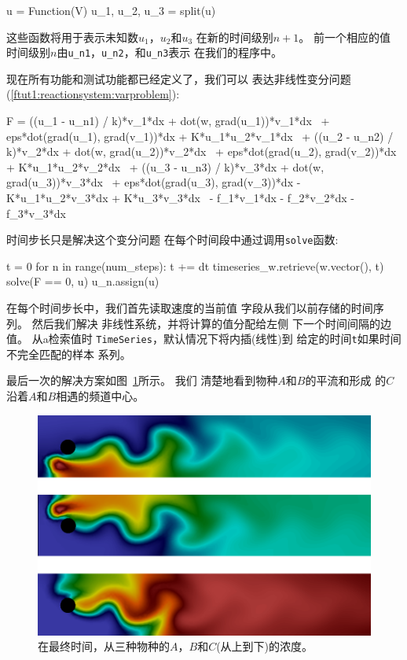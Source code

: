 \begin{python}
u = Function(V)
u_1, u_2, u_3 = split(u)
\end{python}
这些函数将用于表示未知数$u_1$，$u_2$和$u_3$
在新的时间级别$n+1$。 前一个相应的值
时间级别$n$由\verb!u_n1!，\verb!u_n2!，和\verb!u_n3!表示 在我们的程序中。

现在所有功能和测试功能都已经定义了，我们可以
表达非线性变分问题
(\ref{ftut1:reactionsystem:varproblem}):

\begin{python}
F = ((u_1 - u_n1) / k)*v_1*dx + dot(w, grad(u_1))*v_1*dx \
  + eps*dot(grad(u_1), grad(v_1))*dx + K*u_1*u_2*v_1*dx  \
  + ((u_2 - u_n2) / k)*v_2*dx + dot(w, grad(u_2))*v_2*dx \
  + eps*dot(grad(u_2), grad(v_2))*dx + K*u_1*u_2*v_2*dx  \
  + ((u_3 - u_n3) / k)*v_3*dx + dot(w, grad(u_3))*v_3*dx \
  + eps*dot(grad(u_3), grad(v_3))*dx - K*u_1*u_2*v_3*dx + K*u_3*v_3*dx \
  - f_1*v_1*dx - f_2*v_2*dx - f_3*v_3*dx
\end{python}

时间步长只是解决这个变分问题
在每个时间段中通过调用\texttt{solve}函数:

\begin{python}
t = 0
for n in range(num_steps):
    t += dt
    timeseries_w.retrieve(w.vector(), t)
    solve(F == 0, u)
    u_n.assign(u)
\end{python}
在每个时间步长中，我们首先读取速度的当前值
字段从我们以前存储的时间序列。 然后我们解决
非线性系统，并将计算的值分配给左侧
下一个时间间隔的边值。 从a检索值时
\texttt{TimeSeries}，默认情况下将内插(线性)到
给定的时间\texttt{t}如果时间不完全匹配的样本
系列。

最后一次的解决方案如图~\ref{ftut1:fig:reactionsystem:solution}所示。 我们
清楚地看到物种$A$和$B$的平流和形成
的$C$
沿着$A$和$B$相遇的频道中心。

\begin{figure}[!ht]  %
 \centerline{\includegraphics[width=0.95\linewidth]{fig/reaction_system.png}}
 \caption{
 在最终时间，从三种物种的$A$，$B$和$C$(从上到下)的浓度。\label{ftut1:fig:reactionsystem:solution}
 }
\end{figure}

